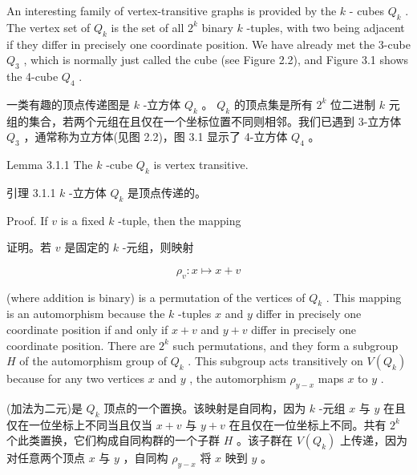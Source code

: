 \documentclass[10pt]{article}
\begin{document}
An interesting family of vertex-transitive graphs is provided by the \(k\) - cubes \({Q}_{k}\) . The vertex set of \({Q}_{k}\) is the set of all \({2}^{k}\) binary \(k\) -tuples, with two being adjacent if they differ in precisely one coordinate position. We have already met the 3-cube \({Q}_{3}\) , which is normally just called the cube (see Figure 2.2), and Figure 3.1 shows the 4-cube \({Q}_{4}\) .

\begin{tcolorbox}\relax
一类有趣的顶点传递图是 \(k\) -立方体 \({Q}_{k}\) 。 \({Q}_{k}\) 的顶点集是所有 \({2}^{k}\) 位二进制 \(k\) 元组的集合，若两个元组在且仅在一个坐标位置不同则相邻。我们已遇到 3-立方体 \({Q}_{3}\) ，通常称为立方体(见图 2.2)，图 3.1 显示了 4-立方体 \({Q}_{4}\) 。
\end{tcolorbox}

Lemma 3.1.1 The \(k\) -cube \({Q}_{k}\) is vertex transitive.

\begin{tcolorbox}\relax
引理 3.1.1 \(k\) -立方体 \({Q}_{k}\) 是顶点传递的。
\end{tcolorbox}

Proof. If \(v\) is a fixed \(k\) -tuple, then the mapping

\begin{tcolorbox}\relax
证明。若 \(v\) 是固定的 \(k\) -元组，则映射
\end{tcolorbox}

\[
{\rho }_{v} : x \mapsto  x + v
\]

(where addition is binary) is a permutation of the vertices of \({Q}_{k}\) . This mapping is an automorphism because the \(k\) -tuples \(x\) and \(y\) differ in precisely one coordinate position if and only if \(x + v\) and \(y + v\) differ in precisely one coordinate position. There are \({2}^{k}\) such permutations, and they form a subgroup \(H\) of the automorphism group of \({Q}_{k}\) . This subgroup acts transitively on \(V\left( {Q}_{k}\right)\) because for any two vertices \(x\) and \(y\) , the automorphism \({\rho }_{y - x}\) maps \(x\) to \(y\) .

\begin{tcolorbox}\relax
(加法为二元)是 \({Q}_{k}\) 顶点的一个置换。该映射是自同构，因为 \(k\) -元组 \(x\) 与 \(y\) 在且仅在一位坐标上不同当且仅当 \(x + v\) 与 \(y + v\) 在且仅在一位坐标上不同。共有 \({2}^{k}\) 个此类置换，它们构成自同构群的一个子群 \(H\) 。该子群在 \(V\left( {Q}_{k}\right)\) 上传递，因为对任意两个顶点 \(x\) 与 \(y\) ，自同构 \({\rho }_{y - x}\) 将 \(x\) 映到 \(y\) 。
\end{tcolorbox}
\end{document}
